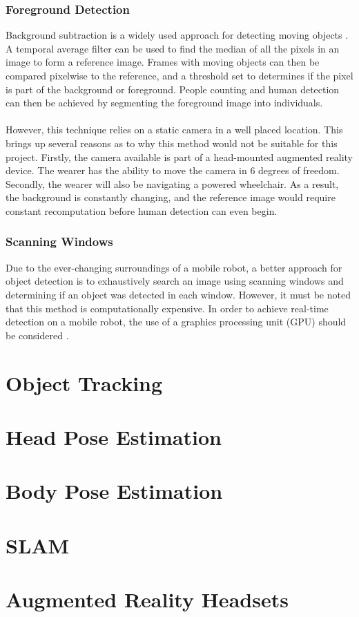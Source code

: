 \subsubsection{Foreground Detection}
Background subtraction is a widely used approach for detecting moving objects \cite{Piccardi2004}. A temporal average filter can be used to find the median of all the pixels in an image to form a reference image. Frames with moving objects can then be compared pixelwise to the reference, and a threshold set to determines if the pixel is part of the background or foreground. People counting and human detection can then be achieved by segmenting the foreground image into individuals.

\paragraph{} However, this technique relies on a static camera in a well placed location. This brings up several reasons as to why this method would not be suitable for this project. Firstly, the camera available is part of a head-mounted augmented reality device. The wearer has the ability to move the camera in 6 degrees of freedom. Secondly, the wearer will also be navigating a powered wheelchair. As a result, the background is constantly changing, and the reference image would require constant recomputation before human detection can even begin.

\subsubsection{Scanning Windows}
Due to the ever-changing surroundings of a mobile robot, a better approach for object detection is to exhaustively search an image using scanning windows and determining if an object was detected in each window. However, it must be noted that this method is computationally expensive. In order to achieve real-time detection on a mobile robot, the use of a graphics processing unit (GPU) should be considered \cite{Hirabayashi}.



\section{Object Tracking}

\section{Head Pose Estimation}

\section{Body Pose Estimation}

\section{SLAM}

\section{Augmented Reality Headsets}